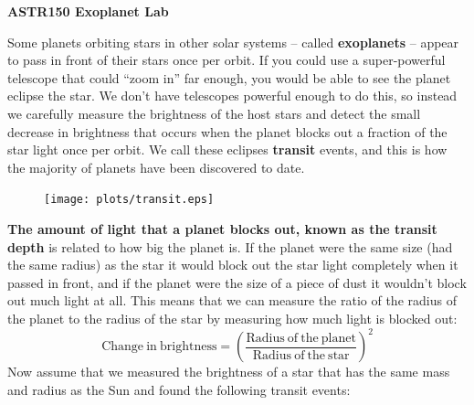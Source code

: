\documentclass[12pt]{article}
\begin{document}

\begin{center}
\bf ASTR150 Exoplanet Lab
\end{center}

Some planets orbiting stars in other solar systems -- called {\bf exoplanets} -- appear to pass in front of their stars once per orbit. If you could use a super-powerful telescope that could ``zoom in'' far enough, you would be able to see the planet eclipse the star. We don't have telescopes powerful enough to do this, so instead we carefully measure the brightness of the host stars and detect the small decrease in brightness that occurs when the planet blocks out a fraction of the star light once per orbit.  We call these eclipses {\bf transit} events, and this is how the majority of planets have been discovered to date.
\begin{figure}[h!]
\centering
\texttt{[image: plots/transit.eps]}
\end{figure}

{\bf The amount of light that a planet blocks out, known as the transit depth} is related to how big the planet is. If the planet were the same size (had the same radius) as the star it would block out the star light completely when it passed in front, and if the planet were the size of a piece of dust it wouldn't block out much light at all. This means that we can measure the ratio of the radius of the planet to the radius of the star by measuring how much light is blocked out: 
\begin{equation}
\mathrm{Change~in~brightness} = \left( \frac{\mathrm{Radius~of~the~planet}}{\mathrm{Radius~of~the~star}} \right)^2 \label{eqn:depth}
\end{equation}
Now assume that we measured the brightness of a star that has the same mass and radius as the Sun and found the following transit events:
\pagebreak
\end{document}
